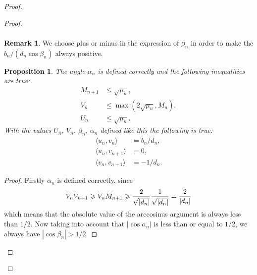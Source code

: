 \documentclass[12pt]{article}
\renewcommand{\leq}{\leqslant}
\renewcommand{\geq}{\geqslant}
\newtheorem{prop}{Proposition}
\theoremstyle{definition}
\newtheorem*{remark*}{Remark}
\numberwithin{remark}{section}
\numberwithin{theorem}{section}
\numberwithin{prop}{section}
\numberwithin{equation}{section}
\numberwithin{lemma}{section}
\numberwithin{prop_under_lemma}{lemma}
\begin{document}
\begin{proof}
\begin{proof}
\begin{align*}
                \end{align*}
                \begin{remark*}
                    We choose plus or minus in the expression of $\beta_n$ in order to make the $b_n/(d_n \cos{\beta_n})$ always positive.
                \end{remark*}
                \begin{prop}
                    The angle $\alpha_n$ is defined correctly and the following inequalities are true:
                    \begin{align*}
                        M_{n+1} &\leq \sqrt{\mu_n},\\
                        V_n &\leq \max(2\sqrt{\mu_n}, M_n),\\
                        U_n &\leq \sqrt{\mu_n}.
                    \end{align*}
                    With the values $U_n$, $V_n$, $\beta_n$, $\alpha_n$ defined like this the following is true:
                    \begin{align*}
                        \langle u_n, v_n \rangle &= b_n/d_n,\\
                        \langle u_n, v_{n+1} \rangle &= 0,\\
                        \langle v_n, v_{n+1} \rangle &= -1/d_n.
                    \end{align*}
                \end{prop}
                \begin{proof}
                    Firstly $\alpha_n$ is defined correctly, since
                    $$
                    V_n V_{n+1} \geq V_n M_{n+1} \geq \frac{2}{\sqrt{\smash[b]{|d_n|}}} \frac{1}{\sqrt{\smash[b]{|d_n|}}}
                     = \frac{2}{|d_n|}
                    $$
                    which means that the absolute value of the arccosinus argument is always less than $1/2$. Now taking into
                    account that $|\cos{\alpha_n}|$ is less than or equal to $1/2$, we always have $|\cos{\beta_n}| > 1/2$.
                    

\end{proof}
\end{proof}
\end{proof}
\end{document}
